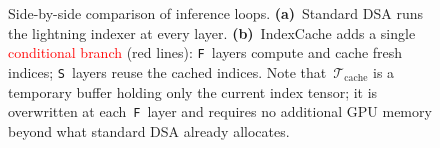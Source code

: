 \begin{figure}[t]
\begin{minipage}[t]{0.48\textwidth}
\begin{algorithm}[H]
\begin{algorithmic}[1]
\ENDFOR
\end{algorithmic}
\end{algorithm}
\end{minipage}
\caption{%
    Side-by-side comparison of inference loops.
    \textbf{(a)}~Standard DSA runs the lightning indexer at every layer.
    \textbf{(b)}~IndexCache adds a single \textcolor{red}{conditional branch} (red lines): \texttt{F}~layers compute and cache fresh indices; \texttt{S}~layers reuse the cached indices.
    Note that~$\mathcal{T}_{\mathrm{cache}}$ is a temporary buffer holding only the current index tensor; it is overwritten at each~\texttt{F}~layer and requires no additional GPU memory beyond what standard DSA already allocates.
}
\label{fig:pseudocode-comparison}
\end{figure}
